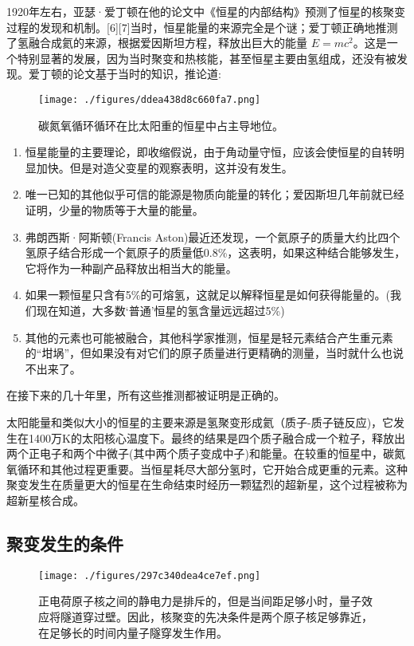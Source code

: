 1920年左右，亚瑟·爱丁顿在他的论文中《恒星的内部结构》预测了恒星的核聚变过程的发现和机制。[6][7]当时，恒星能量的来源完全是个谜；爱丁顿正确地推测了氢融合成氦的来源，根据爱因斯坦方程，释放出巨大的能量 $E = mc^2$。这是一个特别显著的发展，因为当时聚变和热核能，甚至恒星主要由氢组成，还没有被发现。爱丁顿的论文基于当时的知识，推论道:
\begin{figure}[ht]
\centering
\texttt{[image: ./figures/ddea438d8c660fa7.png]}
\caption{碳氮氧循环循环在比太阳重的恒星中占主导地位。} \label{fig_HJB_3}
\end{figure}
\begin{enumerate}
\item 恒星能量的主要理论，即收缩假说，由于角动量守恒，应该会使恒星的自转明显加快。但是对造父变星的观察表明，这并没有发生。
\item 唯一已知的其他似乎可信的能源是物质向能量的转化；爱因斯坦几年前就已经证明，少量的物质等于大量的能量。
\item 弗朗西斯·阿斯顿(Francis Aston)最近还发现，一个氦原子的质量大约比四个氢原子结合形成一个氦原子的质量低0.8\%，这表明，如果这种结合能够发生，它将作为一种副产品释放出相当大的能量。
\item 如果一颗恒星只含有5\%的可熔氢，这就足以解释恒星是如何获得能量的。(我们现在知道，大多数‘普通’恒星的氢含量远远超过5\%)
\item 其他的元素也可能被融合，其他科学家推测，恒星是轻元素结合产生重元素的“坩埚”，但如果没有对它们的原子质量进行更精确的测量，当时就什么也说不出来了。
\end{enumerate}
在接下来的几十年里，所有这些推测都被证明是正确的。

太阳能量和类似大小的恒星的主要来源是氢聚变形成氦（质子-质子链反应)，它发生在1400万K的太阳核心温度下。最终的结果是四个质子融合成一个粒子，释放出两个正电子和两个中微子(其中两个质子变成中子)和能量。在较重的恒星中，碳氮氧循环和其他过程更重要。当恒星耗尽大部分氢时，它开始合成更重的元素。这种聚变发生在质量更大的恒星在生命结束时经历一颗猛烈的超新星，这个过程被称为超新星核合成。

\subsection{聚变发生的条件}
\begin{figure}[ht]
\centering
\texttt{[image: ./figures/297c340dea4ce7ef.png]}
\caption{正电荷原子核之间的静电力是排斥的，但是当间距足够小时，量子效应将隧道穿过壁。因此，核聚变的先决条件是两个原子核足够靠近，在足够长的时间内量子隧穿发生作用。} \label{fig_HJB_4}
\end{figure}


